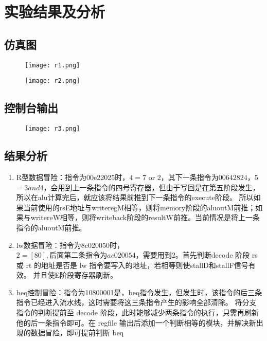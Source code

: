 \section{实验结果及分析}
\subsection{仿真图}
\begin{figure}[htbp]
    \centering
    \texttt{[image: r1.png]}
    \label{fig:my_label}
\end{figure}
\begin{figure}[htbp]
    \centering
    \texttt{[image: r2.png]}
    \label{fig:my_label}
\end{figure}

\subsection{控制台输出}
\begin{figure}[htbp]
    \centering
    \texttt{[image: r3.png]}
    \label{fig:my_label}
\end{figure}

\subsection{结果分析}
\begin{enumerate}
    \item R型数据冒险：指令为00e22025时，$4 = $7 or $2，其下一条指令为00642824，$5 = $3 and $4，会用到上一条指令的四号寄存器，但由于写回是在第五阶段发生，所以在alu计算完后，就应该将结果前推到下一条指令的execute阶段。
    所以如果当前使用的rsE地址与writeregM相等，则将memory阶段的aluoutM前推；如果与writereW相等，则将writeback阶段的resultW前推。当前情况是将上一条指令的aluoutM前推。
    \item lw数据冒险：指令为8c020050时，$2 = [80],后面第二条指令为ac020054，需要用到$2。首先判断decode 阶段 rs 或 rt 的地址是否是 lw 指令要写入的地址，若相等则使stallD和stallF信号有效。
    并且使E阶段寄存器刷新。
    \item beq控制冒险：指令为10800001是，beq指令发生，但发生时，该指令的后三条指令已经进入流水线，这时需要将这三条指令产生的影响全部清除。
    将分支指令的判断提前至 decode 阶段，此时能够减少两条指令的执行，只需再刷新他的后一条指令即可。在 regfile 输出后添加一个判断相等的模块，并解决新出现的数据冒险，即可提前判断 beq
\end{enumerate}